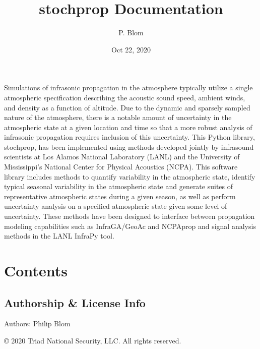 \documentclass[letterpaper,10pt,english]{sphinxmanual}
\title{stochprop Documentation}
\date{Oct 22, 2020}
\author{P. Blom}
\begin{document}
\pagestyle{empty}
\sphinxmaketitle
\pagestyle{plain}
\sphinxtableofcontents
\pagestyle{normal}
\label{\detokenize{index::doc}}


Simulations of infrasonic propagation in the atmosphere typically utilize a single atmospheric specification describing the acoustic sound speed, ambient winds, and density as a function of altitude.  Due to the dynamic and sparsely sampled nature of the atmosphere, there is a notable amount of uncertainty in the atmospheric state at a given location and time so that a more robust analysis of infrasonic propagation requires inclusion of this uncertainty.  This Python library, stochprop, has been implemented using methods developed jointly by infrasound scientists at Los Alamos National Laboratory (LANL) and the University of Mississippi’s National Center for Physical Acoustics (NCPA).  This software library includes methods to quantify variability in the atmospheric state, identify typical seasonal variability in the atmospheric state and generate suites of representative atmospheric states during a given season, as well as perform uncertainty analysis on a specified atmospheric state given some level of uncertainty.  These methods have been designed to interface between propagation modeling capabilities such as InfraGA/GeoAc and NCPAprop and signal analysis methods in the LANL InfraPy tool.


\chapter{Contents}
\label{\detokenize{index:module-stochprop}}\label{\detokenize{index:contents}}

\section{Authorship \& License Info}
\label{\detokenize{authorship:authorship-license-info}}\label{\detokenize{authorship:authorship}}\label{\detokenize{authorship::doc}}
Authors: Philip Blom

© 2020 Triad National Security, LLC. All rights reserved.
\end{document}

